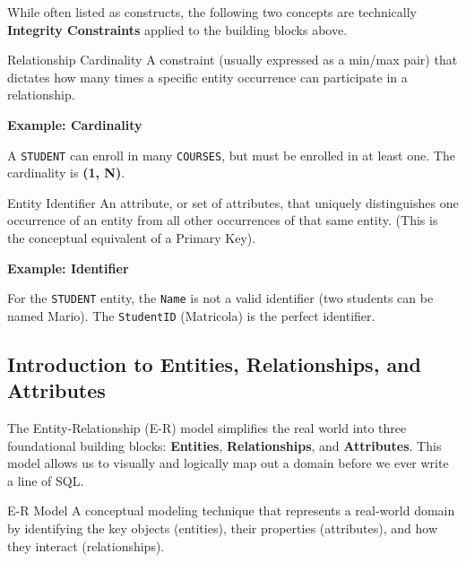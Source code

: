 While often listed as constructs, the following two concepts are technically \textbf{Integrity Constraints} applied to the building blocks above.

\begin{defbox}{Relationship Cardinality}
A constraint (usually expressed as a min/max pair) that dictates how many times a specific entity occurrence can participate in a relationship.
\end{defbox}

\vspace{0.2cm}
\begin{example}{\textbf{Example: Cardinality}}

A \texttt{STUDENT} can enroll in many \texttt{COURSES}, but must be enrolled in at least one. The cardinality is \textbf{(1, N)}.
\end{example}

\begin{defbox}{Entity Identifier}
An attribute, or set of attributes, that uniquely distinguishes one occurrence of an entity from all other occurrences of that same entity. (This is the conceptual equivalent of a Primary Key).
\end{defbox}

\vspace{0.2cm}
\begin{example}{\textbf{Example: Identifier}}
  
For the \texttt{STUDENT} entity, the \texttt{Name} is not a valid identifier (two students can be named Mario). The \texttt{StudentID} (Matricola) is the perfect identifier.
\end{example}
\subsection{Introduction to Entities, Relationships, and Attributes}

The Entity-Relationship (E-R) model simplifies the real world into three foundational building blocks: \textbf{Entities}, \textbf{Relationships}, and \textbf{Attributes}. This model allows us to visually and logically map out a domain before we ever write a line of SQL.

\begin{defbox}{E-R Model}
A conceptual modeling technique that represents a real-world domain by identifying the key objects (entities), their properties (attributes), and how they interact (relationships).
\end{defbox}

